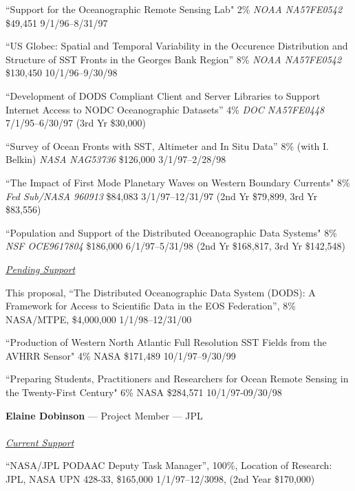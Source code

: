 \documentclass[12pt]{article}
\begin{document}
\Hpar ``Support for the Oceanographic Remote Sensing Lab" 2\% {\em NOAA NA57FE0542}
\$49,451 9/1/96--8/31/97

\Hpar ``US Globec: Spatial and Temporal Variability in the Occurence
Distribution and Structure of SST Fronts in the Georges
Bank Region'' 8\% {\em NOAA NA57FE0542} \$130,450  10/1/96--9/30/98

\Hpar ``Development of DODS Compliant Client and Server Libraries to Support
Internet Access to NODC Oceanographic Datasets'' 4\% {\em DOC NA57FE0448}
7/1/95--6/30/97 (3rd Yr \$30,000)

\Hpar ``Survey of Ocean Fronts with SST, Altimeter and In Situ Data'' 8\% 
(with I. Belkin) {\em NASA NAG53736} \$126,000 3/1/97--2/28/98

\Hpar ``The Impact of First Mode Planetary Waves on Western Boundary Currents"
8\% {\em Fed Sub/NASA 960913} \$84,083  3/1/97--12/31/97 (2nd Yr  \$79,899, 3rd Yr \$83,556)

\Hpar ``Population and Support of the Distributed Oceanographic Data Systems" 
8\% {\em NSF OCE9617804} \$186,000 6/1/97--5/31/98  (2nd Yr  \$168,817, 3rd Yr \$142,548)

\begin{center}
\underline {\large \em Pending Support}
\end{center}

\Hpar This proposal, ``The Distributed Oceanographic Data System (DODS): A
Framework for Access to Scientific Data in the EOS Federation'', 8\% NASA/MTPE,
\$4,000,000 1/1/98--12/31/00

\Hpar ``Production of Western North Atlantic Full Resolution SST 
Fields from the AVHRR Sensor" 4\% NASA \$171,489  10/1/97--9/30/99  

\Hpar ``Preparing Students, Practitioners and Researchers for Ocean Remote
Sensing in the Twenty-First Century" 6\% NASA \$284,571  10/1/97-09/30/98
\bigskip

\begin{center}
{\large {\bf Elaine Dobinson} --- Project Member --- \acs{JPL}\\
\ \\
\vspace{.08in} \underline {\it Current Support}}\\
 \end{center}

 \Hpar ``NASA/JPL PODAAC Deputy Task Manager'', 100\%, Location of Research:
 JPL, NASA UPN 428-33, \$165,000  1/1/97--12/3098, (2nd Year \$170,000) 
\end{document}
